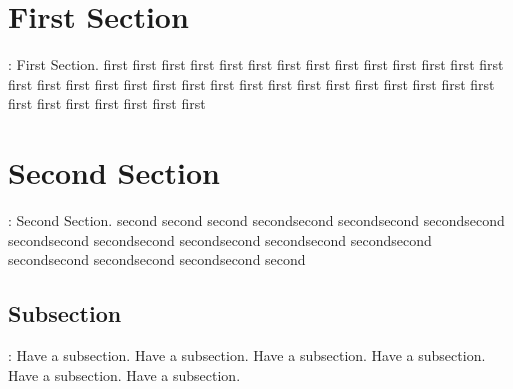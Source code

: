 \documentclass[a4paper,12pt]{article}
\begin{document}
	\section*{First Section}:
	First Section. first first first first first first first first first first first first first first first first first first first first first first first first first first first first first first first first first first first first first first 
	
	\section{Second Section}:
	Second Section. second second second secondsecond secondsecond secondsecond secondsecond secondsecond secondsecond secondsecond secondsecond secondsecond secondsecond secondsecond second
	\subsection{Subsection}:
	Have a subsection.	Have a subsection.	Have a subsection.	Have a subsection.	Have a subsection.	Have a subsection.
	
\end{document}
